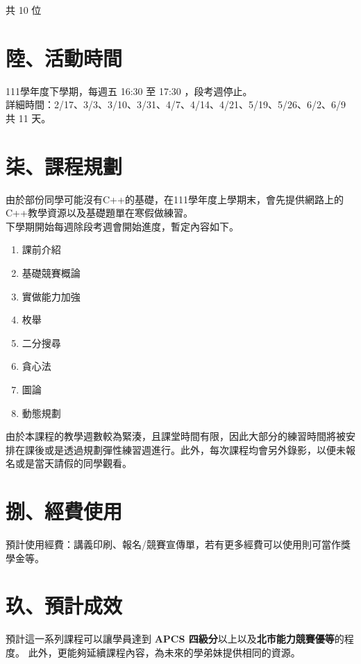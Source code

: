 \documentclass[12pt]{article}
\begin{document}
    \noindent
    共 10 位

    \section*{陸、活動時間}
    111學年度下學期，每週五 16:30 至 17:30 ，段考週停止。\\詳細時間：2/17、3/3、3/10、3/31、4/7、4/14、4/21、5/19、5/26、6/2、6/9\\共 11 天。

    \pagebreak

    \section*{柒、課程規劃}
    由於部份同學可能沒有C++的基礎，在111學年度上學期末，會先提供網路上的C++教學資源以及基礎題單在寒假做練習。\\
    \noindent
    下學期開始每週除段考週會開始進度，暫定內容如下。
    \begin{enumerate}
        \item 課前介紹
        \item 基礎競賽概論
        \item 實做能力加強
        \item 枚舉
        \item 二分搜尋
        \item 貪心法
        \item 圖論
        \item 動態規劃
    \end{enumerate}

    \noindent
    由於本課程的教學週數較為緊湊，且課堂時間有限，因此大部分的練習時間將被安排在課後或是透過規劃彈性練習週進行。此外，每次課程均會另外錄影，以便未報名或是當天請假的同學觀看。

    \section*{捌、經費使用}
    預計使用經費：講義印刷、報名/競賽宣傳單，若有更多經費可以使用則可當作獎學金等。

    \section*{玖、預計成效}
    預計這一系列課程可以讓學員達到 \textbf{APCS 四級分}以上以及\textbf{北市能力競賽優等}的程度。
    此外，更能夠延續課程內容，為未來的學弟妹提供相同的資源。
\end{document}
